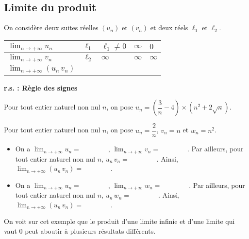 \documentclass[11pt,fleqn]{book} %
\begin{document}
\newpage

\subsection{Limite du produit}



\begin{proposition}On considère deux suites réelles $(u_n)$ et $(v_n)$ et deux réels $\ell_1$ et $\ell_2$. 
\vskip10pt
\begin{tabularx}{\linewidth}{|l|X|X|X|X|}
\hline
$\displaystyle \lim_{n \to +\infty} u_n$ & $\ell_1 $ & $\ell_1 \neq 0$ &  $\infty$ & $0$ \\
\hline
$\displaystyle \lim_{n \to +\infty} v_n$ & $\ell_2$ & $\infty$  & $\infty$  & $\infty$ \\
\hline
$\displaystyle \lim_{n \to +\infty} (u_n \, v_n)$ &  &   &  &  \\
\hline
\end{tabularx}

\begin{center}
 \textbf{r.s. : Règle des signes}
 \end{center} \vspace{-1cm} \end{proposition}

\begin{example} Pour tout entier naturel non nul $n$, on pose $u_n = \left(\dfrac{3}{n}-4\right)\times (n^2+2\sqrt{n})$.

\vskip80pt

\end{example}

\begin{example} Pour tout entier naturel non nul $n$, on pose $u_n=\dfrac{2}{n}$, $v_n=n$ et $w_n=n^2$. 
\begin{itemize}
\item On a $\displaystyle \lim_{n \to +\infty} u_n = \qquad\qquad$, $\displaystyle \lim_{n \to +\infty} v_n = \qquad\qquad$. Par ailleurs, pour tout entier naturel non nul $n$, $u_n \, v_n = \qquad\qquad$. Ainsi, $\displaystyle \lim_{n \to +\infty} (u_n \, v_n) = \qquad\qquad$.
\vskip5pt
\item On a $\displaystyle \lim_{n \to +\infty} u_n = \qquad\qquad$, $\displaystyle \lim_{n \to +\infty} w_n = \qquad\qquad$. Par ailleurs, pour tout entier naturel non nul $n$, $u_n \, w_n = \qquad\qquad$. Ainsi, $\displaystyle \lim_{n \to +\infty} (u_n \, v_n) = \qquad\qquad$.
\end{itemize} 
On voit sur cet exemple que le produit d'une limite infinie et d'une limite qui vaut 0 peut aboutir à plusieurs résultats différents.\end{example}
\end{document}
